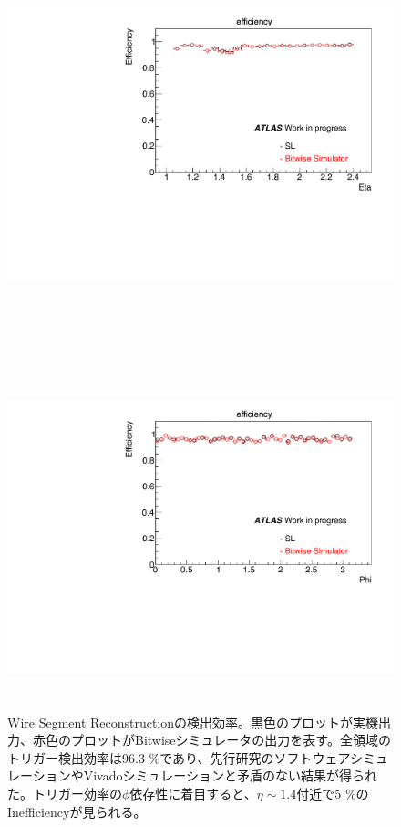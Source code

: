 \begin{figure}
    \begin{minipage}[b]{\linewidth}
    \centering
    \includegraphics[height=10cm]{fig/Test/A_SM_wire_eta.pdf}
    \end{minipage}\\
    \begin{minipage}[b]{\linewidth}
    \centering
    \includegraphics[height=10cm]{fig/Test/A_SM_wire_phi.pdf}
    \end{minipage}%
    \caption[Wire Segment Reconstructionの検出効率]{Wire Segment Reconstructionの検出効率。黒色のプロットが実機出力、赤色のプロットがBitwiseシミュレータの出力を表す。全領域のトリガー検出効率は96.3 \%であり、先行研究のソフトウェアシミュレーションやVivadoシミュレーションと矛盾のない結果が得られた。トリガー効率の$\phi$依存性に着目すると、$\eta\sim1.4$付近で5 \%のInefficiencyが見られる。}
    \label{SM_A_Wire}
\end{figure}

